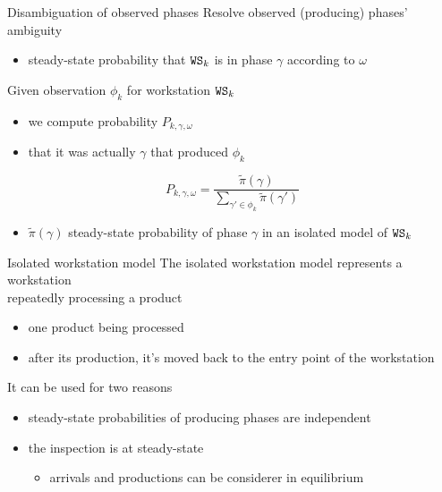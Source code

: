     \begin{frame}{Disambiguation of observed phases}
      Resolve observed (producing) phases' ambiguity
      \begin{itemize}
        \item steady-state probability that $\mathtt{WS}_k$ is in phase $\gamma$ according to $\omega$
      \end{itemize}
      Given observation $\phi_k$ for workstation $\mathtt{WS}_k$
      \begin{itemize}
        \item we compute probability $P_{k,\gamma,\omega}$
        \item that it was actually $\gamma$ that produced $\phi_k$
      \end{itemize}
      
     	\begin{equation*}
       	P_{k,\gamma,\omega} = \frac{\tilde{\pi}(\gamma)}{\displaystyle \sum_{\gamma' \in \phi_k} \tilde{\pi}(\gamma')}
       	\label{eq:probabilityObservation}
     	\end{equation*}
     	
     	\begin{itemize}
       	\item $\tilde{\pi}(\gamma)$ steady-state probability of phase $\gamma$ in an isolated model of $\mathtt{WS}_k$
     	\end{itemize}
    \end{frame}
    
    \begin{frame}{Isolated workstation model}
      The isolated workstation model represents a workstation\\
      repeatedly processing a product
      \begin{itemize}
        \item one product being processed
        \item after its production, it's moved back to the entry point of the workstation
      \end{itemize}
      
      \begin{center}\scalebox{0.6}{}\end{center}
      
      It can be used for two reasons
      \begin{itemize}
        \item steady-state probabilities of producing phases are independent
        \item the inspection is at steady-state
        \begin{itemize}
          \item arrivals and productions can be considerer in equilibrium
        \end{itemize}
      \end{itemize}
    \end{frame}
    
